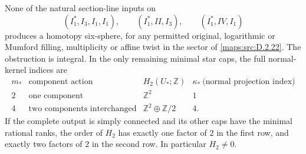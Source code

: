\begin{theorem}
None of the natural section-line inputs on
\[
 (I_1^*,I_3,I_1,I_1),\qquad (I_1^*,II,I_3),\qquad
 (I_1^*,IV,I_1)
\]
produces a homotopy six-sphere, for any permitted original,
logarithmic or Mumford filling, multiplicity or affine twist in
the sector of \ref{maps:src:D.2.22}. The obstruction is integral. In the only
remaining minimal star caps, the full normal-kernel indices are
\[
\begin{array}{c|c|c|c}
 m_*&\text{component action}&H_2(U_*;\mathbb Z)
       &\kappa_*\ \text{(normal projection index)}\\\hline
 2&\text{one component}&\mathbb Z^2&1\\
 4&\text{two components interchanged}&
                   \mathbb Z^2\oplus\mathbb Z/2&4.
\end{array}                                                   \tag{D.ST1}\label{maps:eq:D.ST1}
\]
If the complete output is simply connected and its other caps
have the minimal rational ranks, the order of $H_2$ has exactly
one factor of $2$ in the first row, and exactly two factors of $2$
in the second row. In particular $H_2\ne0$.

\end{theorem}


